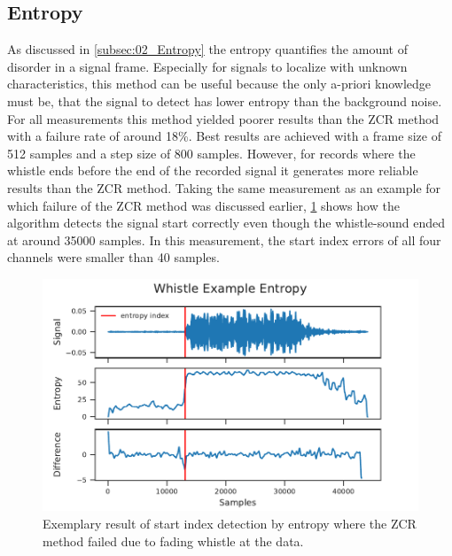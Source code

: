 \subsection{Entropy}
\label{subsec:04_entropy}

As discussed in \cref{subsec:02_Entropy} the entropy quantifies the amount
of disorder in a signal frame.
Especially for signals to localize with unknown characteristics,
this method can be useful because the only a-priori knowledge must be,
that the signal to detect has lower entropy than the background noise.
For all measurements this method yielded poorer results than the \ac{ZCR} method
with a failure rate of around 18\si{\percent}.
Best results are achieved with a frame size of 512 samples and a step size of 800
samples.
However, for records where the whistle ends before the end of the recorded signal
it generates more reliable results than the \ac{ZCR} method.
Taking the same measurement as an example for which failure of the \ac{ZCR} method
was discussed earlier, \cref{fig:04_entropyGood} shows how the algorithm
detects the signal start correctly even though the whistle-sound ended at
around 35000 samples. In this measurement, the start index errors of all four
channels were smaller than 40 samples.
\begin{figure}[ht]
	\centering
	\includegraphics[]{figures/evaluation/entropy_good}
	\caption{Exemplary result of start index detection by entropy where
		the \ac{ZCR} method failed due to fading whistle
		at the data.}
	\label{fig:04_entropyGood}
\end{figure}

